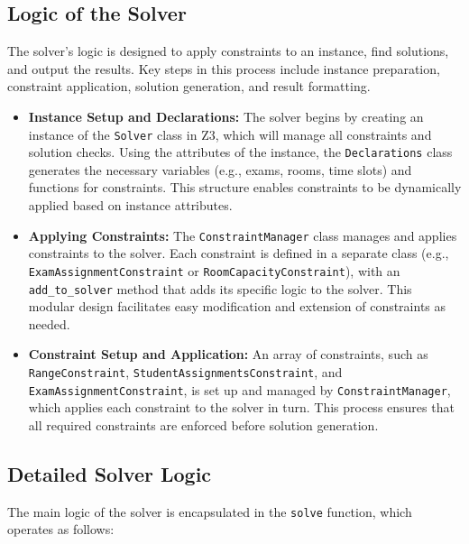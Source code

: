 \documentclass[a4paper]{article}
\begin{document}
    \subsection{Logic of the Solver}
    The solver's logic is designed to apply constraints to an instance, find solutions, and output the results. Key steps in this process include instance preparation, constraint application, solution generation, and result formatting.
    
    \begin{itemize}
        \item \textbf{Instance Setup and Declarations:} The solver begins by creating an instance of the \texttt{Solver} class in Z3, which will manage all constraints and solution checks. Using the attributes of the instance, the \texttt{Declarations} class generates the necessary variables (e.g., exams, rooms, time slots) and functions for constraints. This structure enables constraints to be dynamically applied based on instance attributes.
    
        \item \textbf{Applying Constraints:} The \texttt{ConstraintManager} class manages and applies constraints to the solver. Each constraint is defined in a separate class (e.g., \texttt{ExamAssignment\allowbreak Constraint} or \texttt{Room\allowbreak Capacity\allowbreak Constraint}), with an \texttt{add\allowbreak\_to\allowbreak\_solver} method that adds its specific logic to the solver. This modular design facilitates easy modification and extension of constraints as needed.
    
        \item \textbf{Constraint Setup and Application:} An array of constraints, such as \texttt{RangeConstraint}, \newline \texttt{StudentAssignmentsConstraint}, and \texttt{ExamAssignmentConstraint}, is set up and managed by \texttt{ConstraintManager}, which applies each constraint to the solver in turn. This process ensures that all required constraints are enforced before solution generation.
    \end{itemize}
    
    \subsection{Detailed Solver Logic}
    The main logic of the solver is encapsulated in the \texttt{solve} function, which operates as follows:
    
\end{document}
